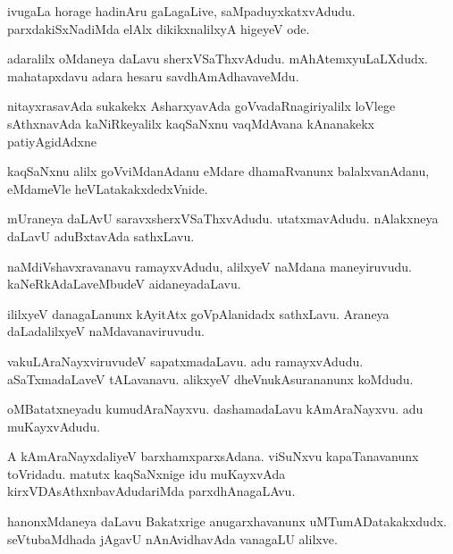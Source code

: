 \documentclass{article}
\begin{document}
\begin{mn}%
ivugaLa horage hadinAru gaLagaLive, saMpaduyxkatxvAdudu. parxdakiSxNadiMda elAlx 
dikikxnalilxyA higeyeV ode.
\end{mn}

\begin{mn}%
adaralilx oMdaneya daLavu sherxVSaThxvAdudu. mAhAtemxyuLaLXdudx. mahatapxdavu adara hesaru 
savdhAmAdhavaveMdu.
\end{mn}

\begin{mn}%
nitayxrasavAda sukakekx AsharxyavAda goVvadaRnagiriyalilx loVlege sAthxnavAda 
kaNiRkeyalilx kaqSaNxnu vaqMdAvana kAnanakekx patiyAgidAdxne
\end{mn}

\begin{mn}%
kaqSaNxnu alilx goVviMdanAdanu eMdare dhamaRvanunx balalxvanAdanu, eMdameVle 
heVLatakakxdedxVnide.
\end{mn}

\begin{mn}%
mUraneya daLAvU saravxsherxVSaThxvAdudu. utatxmavAdudu. nAlakxneya daLavU aduBxtavAda 
sathxLavu.
\end{mn}

\begin{mn}%
naMdiVshavxravanavu ramayxvAdudu, alilxyeV naMdana maneyiruvudu. kaNeRkAdaLaveMbudeV 
aidaneyadaLavu.
\end{mn}

\begin{mn}%
ililxyeV danagaLanunx kAyitAtx goVpAlanidadx sathxLavu. Araneya daLadalilxyeV 
naMdavanaviruvudu.
\end{mn}

\begin{mn}%
vakuLAraNayxviruvudeV sapatxmadaLavu. adu ramayxvAdudu. aSaTxmadaLaveV tALavanavu. alikxyeV 
dheVnukAsurananunx koMdudu.
\end{mn}

\begin{mn}%
oMBatatxneyadu kumudAraNayxvu. dashamadaLavu kAmAraNayxvu. adu muKayxvAdudu.
\end{mn}

\begin{mn}%
A kAmAraNayxdaliyeV barxhamxparxsAdana. viSuNxvu kapaTanavanunx toVridadu. matutx 
kaqSaNxnige idu  muKayxvAda kirxVDAsAthxnbavAdudariMda parxdhAnagaLAvu.
\end{mn}

\begin{mn}%
hanonxMdaneya daLavu Bakatxrige anugarxhavanunx uMTumADatakakxdudx. seVtubaMdhada 
jAgavU nAnAvidhavAda vanagaLU alilxve.
\end{mn}
\end{document}
